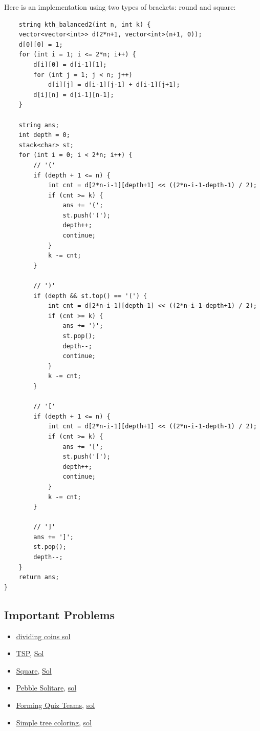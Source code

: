 \documentclass[8pt, a4paper, oneside, twocolumn]{extarticle}
\begin{document}
Here is an implementation using two types of brackets: round and square:
\begin{verbatim}
	string kth_balanced2(int n, int k) {
    vector<vector<int>> d(2*n+1, vector<int>(n+1, 0));
    d[0][0] = 1;
    for (int i = 1; i <= 2*n; i++) {
        d[i][0] = d[i-1][1];
        for (int j = 1; j < n; j++)
            d[i][j] = d[i-1][j-1] + d[i-1][j+1];
        d[i][n] = d[i-1][n-1];
    }

    string ans;
    int depth = 0;
    stack<char> st;
    for (int i = 0; i < 2*n; i++) {
        // '('
        if (depth + 1 <= n) {
            int cnt = d[2*n-i-1][depth+1] << ((2*n-i-1-depth-1) / 2);
            if (cnt >= k) {
                ans += '(';
                st.push('(');
                depth++;
                continue;
            }
            k -= cnt;
        }

        // ')'
        if (depth && st.top() == '(') {
            int cnt = d[2*n-i-1][depth-1] << ((2*n-i-1-depth+1) / 2);
            if (cnt >= k) {
                ans += ')';
                st.pop();
                depth--;
                continue;
            }
            k -= cnt;
        }
            
        // '['
        if (depth + 1 <= n) {
            int cnt = d[2*n-i-1][depth+1] << ((2*n-i-1-depth-1) / 2);
            if (cnt >= k) {
                ans += '[';
                st.push('[');
                depth++;
                continue;
            }
            k -= cnt;
        }

        // ']'
        ans += ']';
        st.pop();
        depth--;
    }
    return ans;
}
\end{verbatim}
\subsection{Important Problems}
\begin{itemize}
    \item \href{https://gist.github.com/sourabh2311/b0f96d91095c812b6100874667724a17}{dividing coins sol}
    \item \href{https://uva.onlinejudge.org/external/104/10496.pdf}{TSP}, \href{https://gist.github.com/sourabh2311/52e95aab8f9ff43c17a6143ea80d7108}{Sol}
    \item \href{https://uva.onlinejudge.org/external/103/10364.pdf}{Square}, \href{https://gist.github.com/sourabh2311/b043d57f0aea7d66edadb747d1c9a9d2}{Sol}
    \item \href{https://uva.onlinejudge.org/external/106/10651.pdf}{Pebble Solitare}, \href{https://gist.github.com/sourabh2311/03ee5ac77c042b2ee5d3188b745b2c0b}{sol}
    \item \href{https://uva.onlinejudge.org/external/109/10911.pdf}{Forming Quiz Teams}, \href{https://gist.github.com/sourabh2311/4985382867071c0518c9dd8b8fd727e9}{sol}
    \item \href{https://uva.onlinejudge.org/external/113/11307.pdf}{Simple tree coloring}, \href{https://gist.github.com/sourabh2311/fc1112b44a455310f601967768e1d212}{sol}
\end{itemize}
\end{document}
